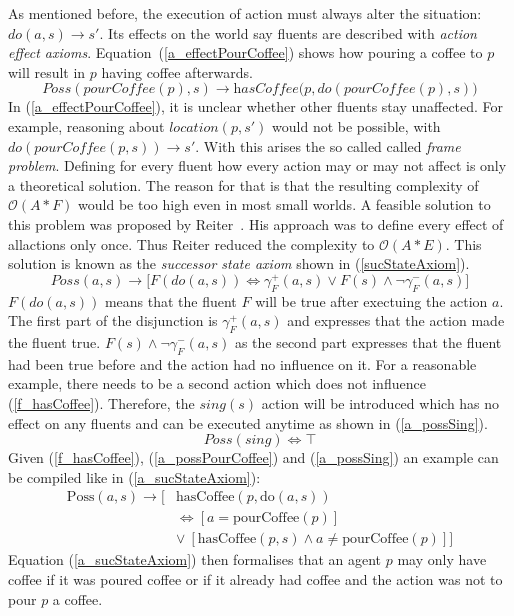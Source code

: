 As mentioned before, the execution of action must always alter the situation: $\textit{do}(a,s) \rightarrow s'$. Its effects on the world say fluents are described with \emph{action effect axioms}. Equation~(\ref{a_effectPourCoffee}) shows how pouring a coffee to $p$ will result in $p$ having coffee afterwards.
\begin{equation}\label{a_effectPourCoffee}
  \textit{Poss}(\textit{pourCoffee}(p),s) \rightarrow \textit{hasCoffee}\big(p,\textit{do}(\textit{pourCoffee}(p),s)\big)
\end{equation}
In (\ref{a_effectPourCoffee}), it is unclear whether other fluents stay unaffected. For example, reasoning about $location(p,s')$ would not be possible, with $\textit{do}(\textit{pourCoffee}(p,s)) \rightarrow s'$. With this arises the so called called \emph{frame problem}. Defining for every fluent how every action may or may not affect is only a theoretical solution. The reason for that is that the resulting complexity of $\mathcal{O}(A*F)$ would be too high even in most small worlds. A feasible solution to this problem was proposed by Reiter~\cite{reiter_frame_1991}. His approach was to define every effect of allactions only once. Thus Reiter reduced the complexity to $\mathcal{O}(A*E)$. This solution is known as the \emph{successor state axiom} shown in (\ref{sucStateAxiom}).
\begin{equation}\label{sucStateAxiom}
  \mathit{Poss}(a,s)\rightarrow \big[\mathit{F}(\mathit{do}(a,s)) \Leftrightarrow\gamma_\mathit{F}^+(a,s)\vee\mathit{F}(s)\wedge\neg\gamma_\mathit{F}^-(a,s)\big]
\end{equation}
$\mathit{F}(\mathit{do}(a,s))$ means that the fluent $F$ will be true after exectuing the action $a$. The first part of the disjunction is $\gamma_\mathit{F}^+(a,s)$ and expresses that the action made the fluent true. $\mathit{F}(s)\wedge\neg\gamma_\mathit{F}^-(a,s)$ as the second part expresses that the fluent had been true before and the action had no influence on it. For a reasonable example, there needs to be a second action which does not influence (\ref{f_hasCoffee}). Therefore, the $sing(s)$ action will be introduced which has no effect on any fluents and can be executed anytime as shown in (\ref{a_possSing}).
\begin{equation}\label{a_possSing}
  \mathit{Poss}(\mathit{sing}) \Leftrightarrow \top
\end{equation}
Given (\ref{f_hasCoffee}), (\ref{a_possPourCoffee}) and (\ref{a_possSing}) an example can be compiled like in (\ref{a_sucStateAxiom}):
\begin{equation}\label{a_sucStateAxiom}
  \begin{split}
    \mathrm{Poss}(a,s)\rightarrow \big[&\mathrm{hasCoffee}(p,\mathrm{do}(a,s))
\\    &\Leftrightarrow [a=\mathrm{pourCoffee}(p)]
\\    &\vee\ [\mathrm{hasCoffee}(p,s) \wedge a\neq \mathrm{pourCoffee}(p)]\big]
  \end{split}
\end{equation}
Equation (\ref{a_sucStateAxiom}) then formalises that an agent $p$ may only have coffee if it was poured coffee or if it already had coffee and the action was not to pour $p$ a coffee.

